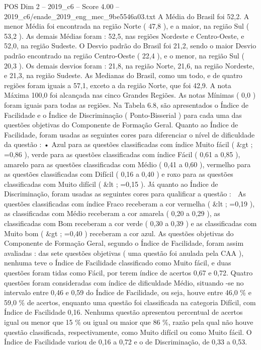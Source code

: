 \begin{textsample}{POS Dim 2 – 2019\_c6 – Score 4.00 – 2019\_c6/enade\_2019\_eng\_mec\_9be5546a03.txt}
A Média do Brasil foi 52,2.
A menor Média foi encontrada na região Norte ( 47,8 ), e a maior, na região Sul ( 53,2 ).
As demais Médias foram : 52,5, nas regiões Nordeste e Centro-Oeste, e 52,0, na região Sudeste.
O Desvio padrão do Brasil foi 21,2, sendo o maior Desvio padrão encontrado na região Centro-Oeste ( 22,4 ), e o menor, na região Sul ( 20,3 ).
Os demais desvios foram : 21,8, na região Norte, 21,6, na região Nordeste, e 21,3, na região Sudeste.
As Medianas do Brasil, como um todo, e de quatro regiões foram iguais a 57,1, exceto a da região Norte, que foi 42,9.
A nota Máxima 100,0 foi alcançada nas cinco Grandes Regiões.
As notas Mínimas ( 0,0 ) foram iguais para todas as regiões.
Na Tabela 6.8, são apresentados o Índice de Facilidade e o Índice de Discriminação ( Ponto-Bisserial ) para cada uma das questões objetivas do Componente de Formação Geral.
Quanto ao Índice de Facilidade, foram usadas as seguintes cores para diferenciar o nível de dificuldade da questão : • Azul para as questões classificadas com índice Muito fácil ( \&gt ; =0,86 ), verde para as questões classificadas com índice Fácil ( 0,61 a 0,85 ), amarelo para as questões classificadas com Médio ( 0,41 a 0,60 ), vermelho para as questões classificadas com Difícil ( 0,16 a 0,40 ) e roxo para as questões classificadas com Muito difícil ( \&lt ; =0,15 ).
Já quanto ao Índice de Discriminação, foram usadas as seguintes cores para qualificar a questão :  As questões classificadas com índice Fraco receberam a cor vermelha ( \&lt ; =0,19 ), as classificadas com Médio receberam a cor amarela ( 0,20 a 0,29 ), as classificadas com Bom receberam a cor verde ( 0,30 a 0,39 ) e as classificadas com Muito bom ( \&gt ; =0,40 ) receberam a cor azul.
As questões objetivas do Componente de Formação Geral, segundo o Índice de Facilidade, foram assim avaliadas : das sete questões objetivas ( uma questão foi anulada pela CAA ), nenhuma teve o Índice de Facilidade classificado como Muito fácil, e duas questões foram tidas como Fácil, por terem índice de acertos 0,67 e 0,72.
Quatro questões foram consideradas com índice de dificuldade Médio, situando -se no intervalo entre 0,46 e 0,59 do Índice de Facilidade, ou seja, houve entre 46,0 \% e 59,0 \% de acertos, enquanto uma questão foi classificada na categoria Difícil, com Índice de Facilidade 0,16.
Nenhuma questão apresentou percentual de acertos igual ou menor que 15 \% ou igual ou maior que 86 \%, razão pela qual não houve questão classificada, respectivamente, como Muito difícil ou como Muito fácil.
O Índice de Facilidade variou de 0,16 a 0,72 e o de Discriminação, de 0,33 a 0,53.

\end{textsample}
